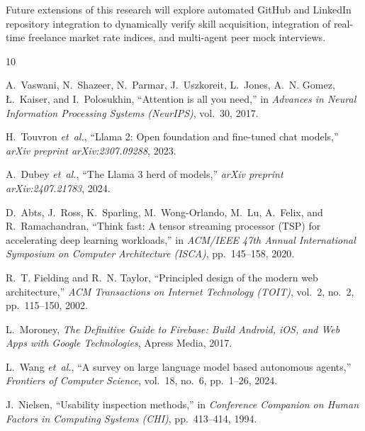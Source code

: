 \documentclass[conference]{IEEEtran}
\begin{document}
Future extensions of this research will explore automated GitHub and LinkedIn repository integration to dynamically verify skill acquisition, integration of real-time freelance market rate indices, and multi-agent peer mock interviews.

\begin{thebibliography}{10}

A.~Vaswani, N.~Shazeer, N.~Parmar, J.~Uszkoreit, L.~Jones, A.~N. Gomez, {\L}.~Kaiser, and I.~Polosukhin, ``Attention is all you need,'' in \emph{Advances in Neural Information Processing Systems (NeurIPS)}, vol.~30, 2017.

H.~Touvron \emph{et~al.}, ``Llama 2: Open foundation and fine-tuned chat models,'' \emph{arXiv preprint arXiv:2307.09288}, 2023.

A.~Dubey \emph{et~al.}, ``The Llama 3 herd of models,'' \emph{arXiv preprint arXiv:2407.21783}, 2024.

D.~Abts, J.~Ross, K.~Sparling, M.~Wong-Orlando, M.~Lu, A.~Felix, and R.~Ramachandran, ``Think fast: A tensor streaming processor (TSP) for accelerating deep learning workloads,'' in \emph{ACM/IEEE 47th Annual International Symposium on Computer Architecture (ISCA)}, pp.~145--158, 2020.

R.~T. Fielding and R.~N. Taylor, ``Principled design of the modern web architecture,'' \emph{ACM Transactions on Internet Technology (TOIT)}, vol.~2, no.~2, pp.~115--150, 2002.

L.~Moroney, \emph{The Definitive Guide to Firebase: Build Android, iOS, and Web Apps with Google Technologies}, Apress Media, 2017.

L.~Wang \emph{et~al.}, ``A survey on large language model based autonomous agents,'' \emph{Frontiers of Computer Science}, vol.~18, no.~6, pp.~1--26, 2024.

J.~Nielsen, ``Usability inspection methods,'' in \emph{Conference Companion on Human Factors in Computing Systems (CHI)}, pp.~413--414, 1994.

\end{thebibliography}
\end{document}
